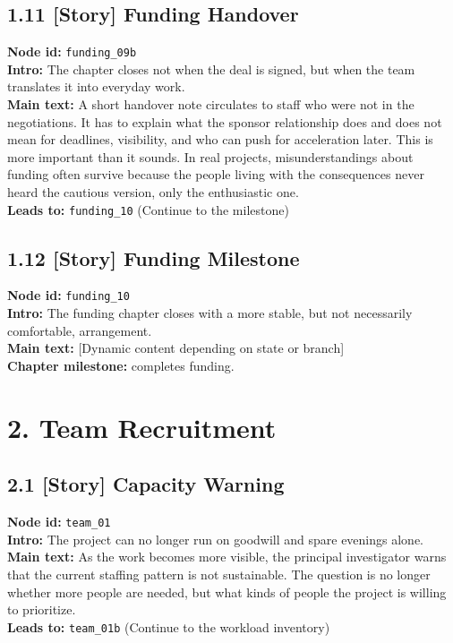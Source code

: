 \documentclass[11pt]{article}
\begin{document}
\subsection*{1.11 [Story] Funding Handover}
\textbf{Node id:} \texttt{funding\_09b}\\
\textbf{Intro:} The chapter closes not when the deal is signed, but when the team translates it into everyday work.\\
\textbf{Main text:} A short handover note circulates to staff who were not in the negotiations. It has to explain what the sponsor relationship does and does not mean for deadlines, visibility, and who can push for acceleration later. This is more important than it sounds. In real projects, misunderstandings about funding often survive because the people living with the consequences never heard the cautious version, only the enthusiastic one.\\
\textbf{Leads to:} \texttt{funding\_10} (Continue to the milestone)\\
\subsection*{1.12 [Story] Funding Milestone}
\textbf{Node id:} \texttt{funding\_10}\\
\textbf{Intro:} The funding chapter closes with a more stable, but not necessarily comfortable, arrangement.\\
\textbf{Main text:} [Dynamic content depending on state or branch]\\
\textbf{Chapter milestone:} completes funding.\\
\section*{2. Team Recruitment}
\subsection*{2.1 [Story] Capacity Warning}
\textbf{Node id:} \texttt{team\_01}\\
\textbf{Intro:} The project can no longer run on goodwill and spare evenings alone.\\
\textbf{Main text:} As the work becomes more visible, the principal investigator warns that the current staffing pattern is not sustainable. The question is no longer whether more people are needed, but what kinds of people the project is willing to prioritize.\\
\textbf{Leads to:} \texttt{team\_01b} (Continue to the workload inventory)\\
\end{document}
